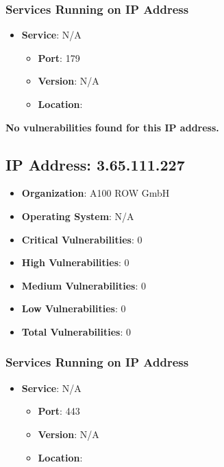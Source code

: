 \documentclass{article}
\begin{document}
\subsubsection*{Services Running on IP Address}

\begin{itemize}
    
        \item \textbf{Service}: N/A
        \begin{itemize}
            \item \textbf{Port}: 179
            \item \textbf{Version}:  N/A 
            \item \textbf{Location}: \href{  }{  }
        \end{itemize}
    
\end{itemize}


\textbf{No vulnerabilities found for this IP address.}




\clearpage



\subsection{IP Address: 3.65.111.227}

\begin{itemize}
    \item \textbf{Organization}: A100 ROW GmbH
    \item \textbf{Operating System}:  N/A 
    \item \textbf{Critical Vulnerabilities}: 0
    \item \textbf{High Vulnerabilities}: 0
    \item \textbf{Medium Vulnerabilities}: 0
    \item \textbf{Low Vulnerabilities}: 0
    \item \textbf{Total Vulnerabilities}: 0
\end{itemize}

\subsubsection*{Services Running on IP Address}

\begin{itemize}
    
        \item \textbf{Service}: N/A
        \begin{itemize}
            \item \textbf{Port}: 443
            \item \textbf{Version}:  N/A 
            \item \textbf{Location}: \href{  }{  }
        \end{itemize}
    
\end{itemize}
\end{document}
